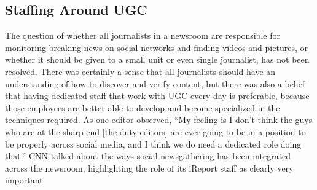 \begin{enumerate}
\section{Staffing Around UGC}
The question of whether all journalists in a newsroom are responsible for
monitoring breaking news on social networks and finding videos and pictures,
or whether it should be given to a small unit or even single journalist,
has not been resolved.
There was certainly a sense that all journalists should have an understanding
of how to discover and verify content, but there was also a belief that
having dedicated staff that work with UGC every day is preferable, because
those employees are better able to develop and become specialized in the
techniques required.
As one editor observed, ``My feeling is I don't think the guys who are at the
sharp end [the duty editors] are ever going to be in a position to be properly
across social media, and I think we do need a dedicated role doing that.''
CNN talked about the ways social newsgathering has been integrated
across the newsroom, highlighting the role of its iReport staff as clearly
very important.


\end{enumerate}
